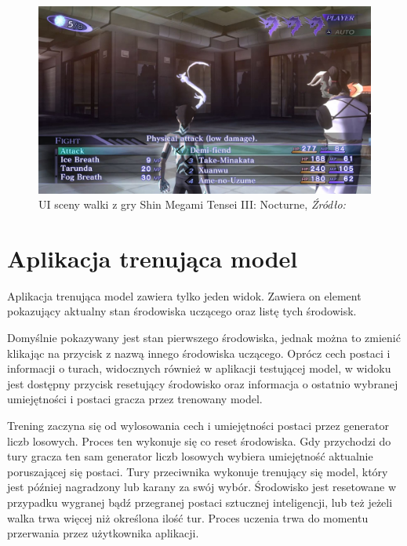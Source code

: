 \documentclass{SGGW-thesis}
\begin{document}
\begin{figure}[H]
  \includegraphics[width=1\textwidth]{smt3_screenshot.jpg}
  \caption{UI sceny walki z gry Shin Megami Tensei III: Nocturne, \textit{Źródło:~\cite{SMT3}}}
\end{figure}
\section{Aplikacja trenująca model}
Aplikacja trenująca model zawiera tylko jeden widok. Zawiera on element pokazujący aktualny stan środowiska uczącego oraz listę tych środowisk. 
\pagebreak

Domyślnie pokazywany jest stan pierwszego środowiska, jednak można to zmienić klikając na przycisk z nazwą innego środowiska uczącego. 
Oprócz cech postaci i informacji o turach, widocznych również w aplikacji testującej model, w widoku jest dostępny przycisk resetujący środowisko oraz informacja o ostatnio wybranej umiejętności i postaci gracza przez trenowany model.

Trening zaczyna się od wylosowania cech i umiejętności postaci przez generator liczb losowych. Proces ten wykonuje się co reset środowiska. Gdy przychodzi do tury gracza ten sam generator liczb losowych wybiera umiejętność aktualnie poruszającej się postaci.
Tury przeciwnika wykonuje trenujący się model, który jest później nagradzony lub karany za swój wybór.
Środowisko jest resetowane w przypadku wygranej bądź przegranej postaci sztucznej inteligencji, lub też jeżeli walka trwa więcej niż określona ilość tur. Proces uczenia trwa do momentu przerwania przez użytkownika aplikacji.
\end{document}
